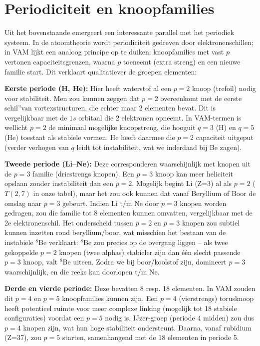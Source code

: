 
\section{Periodiciteit en knoopfamilies}

Uit het bovenstaande emergeert een interessante parallel met het periodiek systeem. In de atoomtheorie wordt periodiciteit gedreven door elektronenschillen; in VAM lijkt een analoog principe op te duiken: knoopfamilies met vast $p$ vertonen capaciteitsgrenzen, waarna $p$ toeneemt (extra streng) en een nieuwe familie start. Dit verklaart qualitatiever de groepen elementen:

\textbf{Eerste periode (H, He):} Hier heeft waterstof al een $p=2$ knoop (trefoil) nodig voor stabiliteit. Men zou kunnen zeggen dat $p=2$ overeenkomt met de eerste \grqq schil\textquotedblright van vortexstructuren, die echter maar 2 elementen bevat. Dit is vergelijkbaar met de $1s$ orbitaal die 2 elektronen opneemt. In VAM-termen is wellicht $p=2$ de minimaal mogelijke knoopstreng, die hooguit $q=3$ (H) en $q=5$ (He) toestaat als stabiele vormen. He heeft daarmee die $p=2$ capaciteit uitgeput (verder verhogen van $q$ leidt tot instabiliteit, wat we inderdaad bij Be zagen).

\textbf{Tweede periode (Li–Ne):} Deze corresponderen waarschijnlijk met knopen uit de $p=3$ familie (driestrengs knopen). Een $p=3$ knoop kan meer heliciteit opslaan zonder instabiliteit dan een $p=2$. Mogelijk begint Li (Z=3) al als $p=2$ ($T(2,7)$ in onze tabel), maar het zou ook kunnen dat vanaf Beryllium of Boor de omslag naar $p=3$ gebeurt. Indien Li t/m Ne door $p=3$ knopen worden gedragen, zou die familie tot 8 elementen kunnen omvatten, vergelijkbaar met de 2e elektronenschil. Het onderscheid tussen $p=2$ en $p=3$ knopen zou subtiel kunnen inzetten rond beryllium/boor, wat misschien het bestaan van de instabiele $^8$Be verklaart: $^8$Be zou precies op de overgang liggen – als twee gekoppelde $p=2$ knopen (twee alpha\rqs s) stabieler zijn dan één slecht passende $p=3$ knoop, valt $^8$Be uiteen. Zodra we bij boor/koolstof zijn, domineert $p=3$ waarschijnlijk, en die reeks kan doorlopen t/m Ne.

\textbf{Derde en vierde periode:} Deze bevatten 8 resp. 18 elementen. In VAM zouden dit $p=4$ en $p=5$ knoopfamilies kunnen zijn. Een $p=4$ (vierstrengs) torusknoop heeft potentieel ruimte voor meer complexe linking (mogelijk tot 18 stabiele configuraties) voordat een $p=5$ nodig is. IJzer-groep (periode 4 midden) zou dus $p=4$ knopen zijn, wat hun hoge stabiliteit ondersteunt. Daarna, vanaf rubidium (Z=37), zou $p=5$ starten, samenhangend met de 18 elementen in periode 5.

